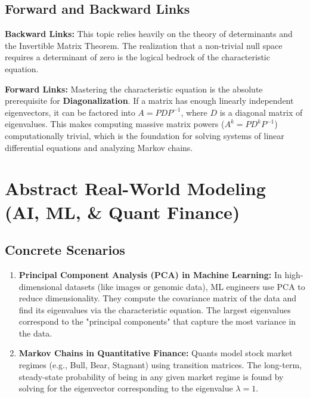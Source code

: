 \documentclass[11pt, a4paper]{article}
\theoremstyle{definition}
\theoremstyle{remark}
\begin{document}
\subsection{Forward and Backward Links}
\textbf{Backward Links:} This topic relies heavily on the theory of determinants and the Invertible Matrix Theorem. The realization that a non-trivial null space requires a determinant of zero is the logical bedrock of the characteristic equation.

\textbf{Forward Links:} Mastering the characteristic equation is the absolute prerequisite for \textbf{Diagonalization}. If a matrix has enough linearly independent eigenvectors, it can be factored into $A = PDP^{-1}$, where $D$ is a diagonal matrix of eigenvalues. This makes computing massive matrix powers ($A^k = PD^kP^{-1}$) computationally trivial, which is the foundation for solving systems of linear differential equations and analyzing Markov chains.

\section{Abstract Real-World Modeling (AI, ML, \& Quant Finance)}

\subsection{Concrete Scenarios}
\begin{enumerate}
    \item \textbf{Principal Component Analysis (PCA) in Machine Learning:} In high-dimensional datasets (like images or genomic data), ML engineers use PCA to reduce dimensionality. They compute the covariance matrix of the data and find its eigenvalues via the characteristic equation. The largest eigenvalues correspond to the "principal components" that capture the most variance in the data.
    \item \textbf{Markov Chains in Quantitative Finance:} Quants model stock market regimes (e.g., Bull, Bear, Stagnant) using transition matrices. The long-term, steady-state probability of being in any given market regime is found by solving for the eigenvector corresponding to the eigenvalue $\lambda = 1$.
\end{enumerate}
\end{document}
